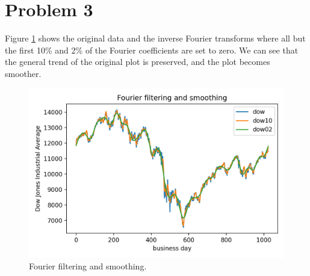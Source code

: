 \documentclass[11pt]{article}
\begin{document}
\section{Problem 3}
Figure \ref{fig:dow} shows the original data and the inverse Fourier transforms where all but the first 10\% and 2\% of the Fourier coefficients are set to zero. We can see that the general trend of the original plot is preserved, and the plot becomes smoother.
\begin{figure}[H]
    \centering
    \includegraphics[scale = 0.8]{images/ps-8-3.png}
    \caption{Fourier filtering and smoothing.}
    \label{fig:dow}
\end{figure}
\end{document}
